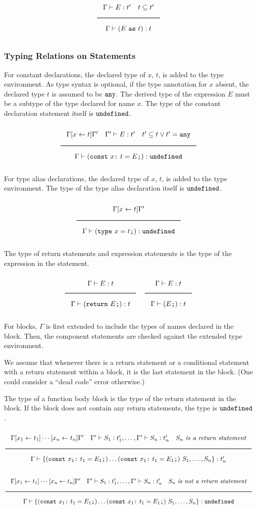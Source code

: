 \noindent
\[
  \Rule{\Gamma \vdash E : t' \quad t \subseteq t'}{\Gamma \vdash (E\ \texttt{as}\ t) : t}  
\]
\noindent

\subsubsection{Typing Relations on Statements}

For constant declarations, the declared type of $x$, $t$, is added to the type environment.
As type syntax is optional, if the type annotation for $x$ absent, the declared type $t$ is assumed to be $\texttt{any}$.
The derived type of the expression $E$ must be a subtype of the type declared for name $x$.
The type of the constant declaration statement itself is $\texttt{undefined}$.

\noindent
\[
  \Rule{\Gamma [x \leftarrow t] \Gamma' \quad \Gamma' \vdash E : t' \quad t' \subseteq t \vee t' = \Any}{
    \Gamma \vdash (\texttt{const}\ x \texttt{:}\ t = E\texttt{;}) : \Undefined}
\]
\noindent

For type alias declarations, the declared type of $x$, $t$, is added to the type environment.
The type of the type alias declaration itself is $\texttt{undefined}$.

\noindent
\[
  \Rule{\Gamma [x \leftarrow t] \Gamma'}{\Gamma \vdash (\texttt{type}\ x = t\texttt{;}) : \Undefined}
\]
\noindent

The type of return statements and expression statements is the type of the expression in the statement.

\noindent
\[
  \Rule{\Gamma \vdash E : t}{\Gamma \vdash (\texttt{return}\ E\texttt{;}) : t}
  \quad
  \Rule{\Gamma \vdash E : t}{\Gamma \vdash (E\texttt{;}) : t}
\]
\noindent

For blocks, $\Gamma$ is first extended to include the types of names declared in the block.
Then, the component statements are checked against the extended type environment.

We assume that whenever there is a return statement or a conditional statement with a return statement within a
block, it is the last statement in the block. (One could consider a ``dead code'' error otherwise.)

The type of a function body block is the type of the return statement in the block.
If the block does not contain any return statements, the type is $\texttt{undefined}$.

\noindent
\[
  \Rule{\Gamma [x_1 \leftarrow t_1] \cdots [x_n \leftarrow t_n] \Gamma' \quad
    \Gamma' \vdash S_1 : t'_1, \ldots, \Gamma' \vdash S_n : t'_n \quad S_n\ \textit{is a return statement}}{
    \Gamma \vdash \{ (\texttt{const}\ x_1 \texttt{:}\ t_1 = E_1\texttt{;}) \ldots (\texttt{const}\ x_1 \texttt{:}\ t_1 = E_1\texttt{;})\
    S_1, \ldots, S_n\} : t'_n}
\]
\noindent
\[
  \Rule{\Gamma [x_1 \leftarrow t_1] \cdots [x_n \leftarrow t_n] \Gamma' \quad
    \Gamma' \vdash S_1 : t'_1, \ldots, \Gamma' \vdash S_n : t'_n \quad S_n\ \textit{is not a return statement}}{
    \Gamma \vdash \{ (\texttt{const}\ x_1 \texttt{:}\ t_1 = E_1\texttt{;}) \ldots (\texttt{const}\ x_1 \texttt{:}\ t_1 = E_1\texttt{;})\
    S_1, \ldots, S_n\} : \Undefined}
\]
\noindent

